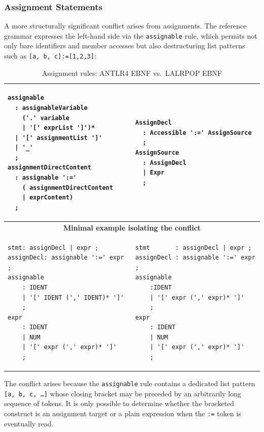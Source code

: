 \subsubsection{Assignment Statements}

A more structurally significant conflict arises from assignments. The reference grammar expresses the left-hand side via the \texttt{assignable} rule, which permits not only bare identifiers and member accesses but also destructuring list patterns such as \texttt{[a, b, c]:=[1,2,3]}:

\begin{table}[h]
    \centering
    \caption{Assignment rules: ANTLR4 EBNF vs.\ LALRPOP EBNF}
    \renewcommand{\arraystretch}{1}
    \begin{tabular}{ |p{7cm}|p{7cm}| }
        \hline
\begin{lstlisting}
assignable
  : assignableVariable
    ('.' variable
    | '[' exprList ']')*
  | '[' assignmentList ']'
  | '_'
  ;
assignmentDirectContent
  : assignable ':='
    ( assignmentDirectContent
    | exprContent)
  ;
\end{lstlisting}
&
\begin{lstlisting}
AssignDecl
  : Accessible ':=' AssignSource
  ;
AssignSource
  : AssignDecl
  | Expr
  ;
\end{lstlisting}
\\
        \hline
        \multicolumn{2}{|c|}{\textbf{Minimal example isolating the conflict}} \\
\begin{lstlisting}
stmt: assignDecl | expr ;
assignDecl: assignable ':=' expr ;
assignable
    : IDENT
    | '[' IDENT (',' IDENT)* ']'
    ;
expr
    : IDENT
    | NUM
    | '[' expr (',' expr)* ']'
    ;
\end{lstlisting}
        &
\begin{lstlisting}
stmt       : assignDecl | expr ;
assignDecl : assignable ':=' expr ;
assignable
    :IDENT
    | '[' expr (',' expr)* ']'
    ;
expr
    : IDENT
    | NUM
    | '[' expr (',' expr)* ']'
    ;
\end{lstlisting}
\\
        \hline
    \end{tabular}
\end{table}
\FloatBarrier

The conflict arises because the \texttt{assignable} rule contains a dedicated list pattern \texttt{[a, b, c, \ldots]} whose closing bracket may be preceded by an arbitrarily long sequence of tokens. It is only possible to determine whether the bracketed construct is an assignment target or a plain expression when the \texttt{:=} token is eventually read.

